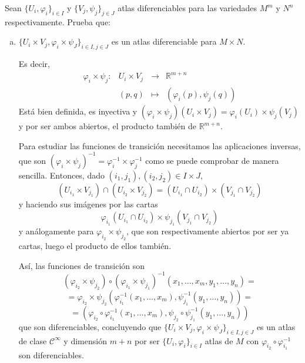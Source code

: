 \begin{ejer}
    [1.16] Sean $\{U_i, \varphi_i\}_{i\in I}$ y $\{V_j, \psi_j\}_{j\in J}$ atlas diferenciables para las variedades $M^m$ y $N^n$ respectivamente. Prueba que: 
    \begin{enumerate}[a)]
        \item $\{U_i \times V_j, \varphi_i \times \psi_J\}_{i\in I, j\in J}$ es un atlas diferenciable para $M \times N$.
        \begin{sol}
            Es decir, 
            $$\begin{array}{rrcl}
                 \varphi_i \times \psi_j :& U_i \times V_j & \longrightarrow & \mathbb R^{m+n} \\
                 & (p,q) & \longmapsto & (\varphi_i(p), \psi_j(q))
            \end{array}$$
            Est\'a bien definida, es inyectiva y $(\varphi_i \times \psi_j)(U_i \times V_j) = \varphi_i (U_i) \times \psi_j (V_j)$ y por ser ambos abiertos, el producto tambi\'en de $\mathbb R ^{m+n}$.

            Para estudiar las funciones de transici\'on necesitamos las aplicaciones inversas, que son 
            $(\varphi_i \times \psi_j)^{-1} = \varphi_i^{-1} \times \varphi_j^{-1}$ como se puede comprobar de manera sencilla. Entonces, dado $(i_1,j_1), (i_2,j_2) \in I \times J$, 
            $$(U_{i_1} \times V_{j_1}) \cap (U_{i_2} \times V_{j_2}) = (U_{i_1} \cap U_{i_2}) \times (V_{j_1} \cap V_{j_2})$$ y haciendo sus im\'agenes por las cartas
            $$\varphi_{i_1}(U_{i_1} \cap U_{i_2}) \times \psi_{j_1}(V_{j_1} \cap V_{j_2})$$
            y an\'alogamente para $\varphi_{i_2} \times \psi_{j_2}$, que son respectivamente abiertos por ser ya cartas, luego el producto de ellos tambi\'en. 
            
            As\'i, las funciones de transici\'on son 
            $$(\varphi_{i_2} \times \psi_{j_2})\circ (\varphi_{i_1} \times \psi_{j_1})^{-1} (x_1, \ldots, x_m, y_1, \ldots, y_n) = $$$$=\varphi_{i_2} \times \psi_{j_2}\left(\varphi_{i_1}^{-1}(x_1, \ldots, x_m), \psi_{j_1}^{-1}(y_1, \ldots, y_n) \right) = $$
            $$= \left(\varphi_{i_2} \circ \varphi_{i_1}^{-1} (x_1, \ldots, x_m), \psi_{j_2} \circ \psi_{j_1}^{-1} (y_1, \ldots, y_n)\right)$$
            que son diferenciables, concluyendo que  $\{U_i \times V_j, \varphi_i \times \psi_J\}_{i\in I, j\in J}$ es un atlas de clase $\mathcal C^{\infty}$ y dimensi\'on $m+n$ por ser $\{U_i , \varphi_i\}_{i\in I}$ atlas de $M$ con $\varphi_{i_2} \circ \varphi_{i_1}^{-1}$ son diferenciables.


\end{sol}
\end{enumerate}
\end{ejer}
